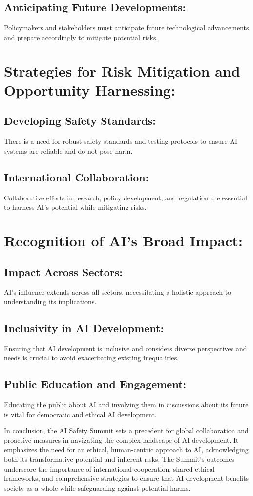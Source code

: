 \documentclass{article}
\begin{document}
\subsection{Anticipating Future Developments:}
Policymakers and stakeholders must anticipate future technological advancements and prepare accordingly to mitigate potential risks.

\section{Strategies for Risk Mitigation and Opportunity Harnessing:}
\subsection{Developing Safety Standards:}
There is a need for robust safety standards and testing protocols to ensure AI systems are reliable and do not pose harm.

\subsection{International Collaboration:}
Collaborative efforts in research, policy development, and regulation are essential to harness AI’s potential while mitigating risks.

\section{Recognition of AI's Broad Impact:}
\subsection{Impact Across Sectors:}
AI's influence extends across all sectors, necessitating a holistic approach to understanding its implications.

\subsection{Inclusivity in AI Development:}
Ensuring that AI development is inclusive and considers diverse perspectives and needs is crucial to avoid exacerbating existing inequalities.

\subsection{Public Education and Engagement:}
Educating the public about AI and involving them in discussions about its future is vital for democratic and ethical AI development.

In conclusion, the AI Safety Summit sets a precedent for global collaboration and proactive measures in navigating the complex landscape of AI development. It emphasizes the need for an ethical, human-centric approach to AI, acknowledging both its transformative potential and inherent risks. The Summit's outcomes underscore the importance of international cooperation, shared ethical frameworks, and comprehensive strategies to ensure that AI development benefits society as a whole while safeguarding against potential harms.
\end{document}
